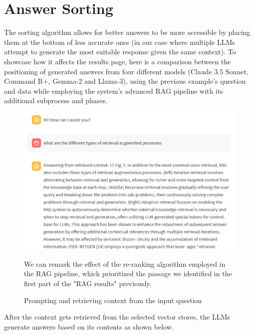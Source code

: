 \section{Answer Sorting}
The sorting algorithm allows for better answers to be more accessible by placing them at the bottom of less accurate ones (in our case where multiple LLMs attempt to generate the most suitable response given the same context).
To showcase how it affects the results page, here is a comparison between the positioning of generated answers from four different models (Claude 3.5 Sonnet, Command R+, Gemma-2 and Llama-3), using the previous example's question and data while employing the system's advanced RAG pipeline with its additional subprocess and phases.
\begin{figure}[H]
    \centering
    \includegraphics[width=\linewidth]{./figures/app-question.png}
    \caption{Prompting and retrieving context from the input question}
    \begin{flushleft}
        We can remark the effect of the re-ranking algorithm employed in the RAG pipeline, which prioritized the passage we identified in the first part of the "RAG results" previously.
    \end{flushleft}
\end{figure}
After the context gets retrieved from the selected vector stores, the LLMs generate answers based on its contents as shown below.
